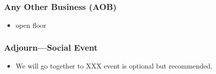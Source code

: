 \documentclass{beamer}
\begin{document}
\begin{frame}
    \frametitle{Any Other Business (AOB)}
    \begin{itemize}
        \item open floor
    \end{itemize}
\end{frame}

\begin{frame}
    \frametitle{Adjourn---Social Event}
    \begin{itemize}
        \item We will go together to XXX
            event is optional but recommended.
    \end{itemize}
\end{frame}
\end{document}
